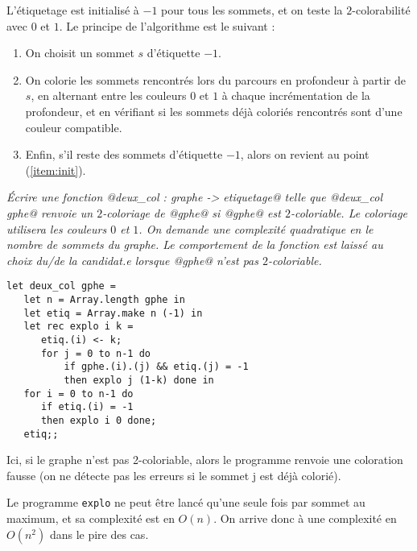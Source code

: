 L'étiquetage est initialisé à $-1$ pour tous les sommets, et on teste la $2$-colorabilité avec $0$ et $1$. Le principe de l'algorithme est le suivant :
\begin{enumerate}
    \item \label{item:init}On choisit un sommet $s$ d'étiquette $-1$.
    \item On colorie les sommets rencontrés lors du parcours en profondeur à partir de $s$, en alternant entre les couleurs $0$ et $1$ à chaque incrémentation de la profondeur, et en vérifiant si les sommets déjà coloriés rencontrés sont d'une couleur compatible. 
    \item Enfin, s'il reste des sommets d'étiquette $-1$, alors on revient au point (\ref{item:init}). 
\end{enumerate}
\begin{Exercise} \it 
Écrire une fonction @deux_col : graphe -> etiquetage@ telle que @deux_col gphe@ renvoie un $2$-coloriage de @gphe@ si @gphe@ est $2$-coloriable. Le coloriage utilisera les couleurs $0$ et $1$. On demande une complexité quadratique en le nombre de sommets du graphe. Le comportement de la fonction est laissé au choix du/de la candidat.e lorsque @gphe@ n'est pas $2$-coloriable. 
\end{Exercise}  
\begin{Answer}
\begin{lstlisting}
let deux_col gphe = 
   let n = Array.length gphe in
   let etiq = Array.make n (-1) in
   let rec explo i k = 
      etiq.(i) <- k;
      for j = 0 to n-1 do
          if gphe.(i).(j) && etiq.(j) = -1 
          then explo j (1-k) done in
   for i = 0 to n-1 do
      if etiq.(i) = -1 
      then explo i 0 done;
   etiq;; 
\end{lstlisting}

Ici, si le graphe n'est pas 2-coloriable, alors le programme renvoie une coloration fausse (on ne détecte pas les erreurs si le sommet j est déjà colorié). 

Le programme \texttt{explo} ne peut être lancé qu'une seule fois par sommet au maximum, et sa complexité est en $O(n)$. On arrive donc à une complexité en $O(n^2)$ dans le pire des cas. 
\end{Answer}
